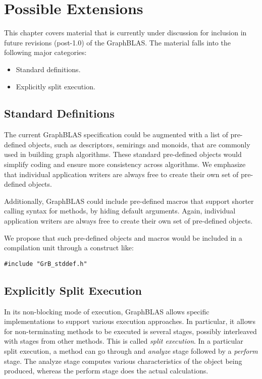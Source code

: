 \chapter{Possible Extensions}
\label{Chp:Extensions}

This chapter covers material that is currently under discussion for inclusion in 
future revisions (post-1.0) of the GraphBLAS. The material falls into the
following major categories:

\begin{itemize}
\item Standard definitions.
\item Explicitly split execution.
\end{itemize}

\section{Standard Definitions}

The current GraphBLAS specification could be augmented with a list of 
pre-defined objects, such as descriptors, semirings and monoids, that are commonly used
in building graph algorithms. These standard pre-defined objects would
simplify coding and ensure more consistency across algorithms. 
We emphasize
that individual application writers are always free to create their own set of
pre-defined objects.

Additionally, GraphBLAS could include pre-defined macros that support
shorter calling syntax for methods, by hiding default arguments. 
Again, individual application writers are always free to create their
own set of pre-defined objects.

We propose that such pre-defined objects and macros would
be included in a compilation unit through a construct like:

\begin{verbatim}
#include "GrB_stddef.h"
\end{verbatim}

\section{Explicitly Split Execution}

In its non-blocking mode of execution, GraphBLAS allows specific implementations to support
various execution approaches. In particular, it allows for non-terminating methods to be 
executed is several stages, possibly interleaved with stages from other methods. This is called \emph{split execution}. In a particular split execution,
a method can go through and \emph{analyze} stage followed by a \emph{perform} stage.
The analyze stage computes various characteristics of the object being produced, whereas the
perform stage does the actual calculations.

